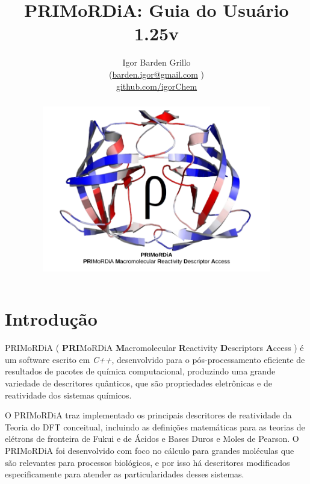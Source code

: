 \documentclass[a4paper,11pt]{refart}
\title{PRIMoRDiA: Guia do Usuário 1.25v  }
\author{Igor Barden Grillo \\(\url{barden.igor@gmail.com} )\\\url{github.com/igorChem}}
\begin{document}
\maketitle

\begin{abstract}
\hspace*{-1.4\leftmarginwidth}
\begin{minipage}{\fullwidth}
\begin{figure}[H]
	\begin{center}
		\includegraphics[width=7in]{logo_primordia}
	\end{center}
\end{figure}

\end{minipage}

\end{abstract}
\newpage
\tableofcontents
\newpage

\section{Introdução}

PRIMoRDiA ( \textbf{PRI}MoRDiA \textbf{M}acromolecular \textbf{R}eactivity \textbf{D}escriptors \textbf{A}ccess ) é um software escrito em \emph{C++}, desenvolvido para o pós-processamento eficiente de resultados de pacotes de química computacional, produzindo uma grande variedade de descritores quânticos, que são propriedades eletrônicas e de reatividade dos sistemas químicos. 

O PRIMoRDiA traz implementado os principais descritores de reatividade da Teoria do DFT conceitual, incluindo as definições matemáticas para as teorias de elétrons de fronteira de Fukui e de Ácidos e Bases Duros e Moles de Pearson. O PRIMoRDiA foi desenvolvido com foco no cálculo para grandes moléculas que são relevantes para processos biológicos, e por isso há descritores modificados especificamente para atender as particularidades desses sistemas. 
\end{document}
